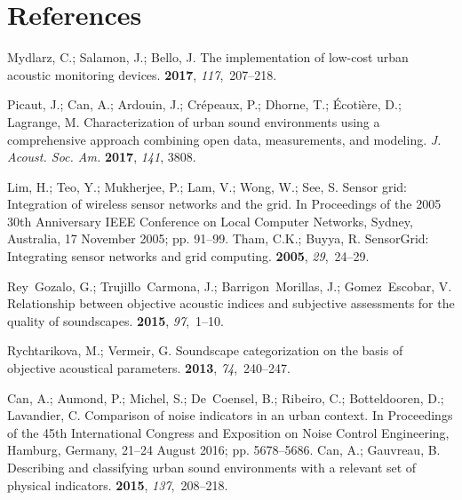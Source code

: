 \documentclass[sensors,article,accept,moreauthors,pdftex,10pt,a4paper]{mdpi}
\begin{document}
\section{References}
\begin{thebibliography}{999}
\providecommand{\natexlab}[1]{#1}

Mydlarz, C.; Salamon, J.; Bello, J.
\newblock The implementation of low-cost urban acoustic monitoring devices.
 {\bf 2017}, {\em 117},~207--218.

Picaut, J.; Can, A.; Ardouin, J.; Cr{\'e}peaux, P.; Dhorne, T.;
  {\'E}coti{\`e}re, D.; Lagrange, M.
\newblock Characterization of urban sound environments using a comprehensive
  approach combining open data, measurements, and modeling.
\newblock   \emph{J. Acoust. Soc. Am. }  \textbf{2017}, \emph{141}, 3808.

Lim, H.; Teo, Y.; Mukherjee, P.; Lam, V.; Wong, W.; See, S.
\newblock Sensor grid: Integration of wireless sensor networks and the grid.
\newblock In Proceedings of the 2005 30th Anniversary IEEE Conference on Local Computer Networks, {Sydney,  Australia, 17 November } 2005; pp. 91--99.
Tham, C.K.; Buyya, R.
\newblock SensorGrid: Integrating sensor networks and grid computing.
 {\bf 2005}, {\em 29},~24--29.

Rey~Gozalo, G.; Trujillo~Carmona, J.; Barrigon~Morillas, J.; Gomez~Escobar, V.
\newblock Relationship between objective acoustic indices and subjective
  assessments for the quality of soundscapes.
 {\bf 2015}, {\em 97},~1--10.

Rychtarikova, M.; Vermeir, G.
\newblock Soundscape categorization on the basis of objective acoustical
  parameters.
 {\bf 2013}, {\em 74},~240--247.

Can, A.; Aumond, P.; Michel, S.; De~Coensel, B.; Ribeiro, C.; Botteldooren, D.;
  Lavandier, C.
\newblock Comparison of noise indicators in an urban context.
\newblock  In Proceedings of the 45th International Congress and Exposition on Noise Control
  Engineering, {Hamburg, Germany, 21--24 August }2016; pp. 5678--5686.
Can, A.; Gauvreau, B.
\newblock Describing and classifying urban sound environments with a relevant
  set of physical indicators.
 {\bf 2015}, {\em 137},~208--218.


\end{thebibliography}
\end{document}
